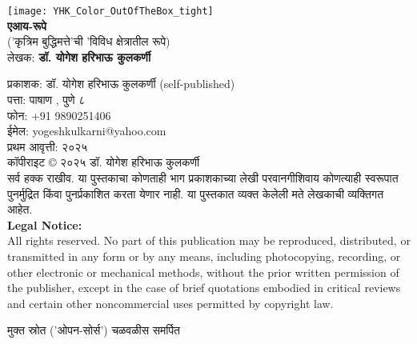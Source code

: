 \thispagestyle{empty}

\begin{center}
\texttt{[image: YHK\_Color\_OutOfTheBox\_tight]} \\[1.5em]

\textbf{\Large एआय-रूपे}\\ [0.5em]
('कृत्रिम बुद्धिमत्ते'ची 'विविध क्षेत्रातील रूपे)\\[0.5em]

लेखक: \textbf{डॉ. योगेश हरिभाऊ कुलकर्णी}\\[1.5em]
\end{center}

\begin{flushleft}

प्रकाशक: डॉ. योगेश हरिभाऊ कुलकर्णी (self-published)\\
पत्ता:  पाषाण ,  पुणे ८ \\
फोन:  +91 9890251406\\
ईमेल: yogeshkulkarni@yahoo.com\\[1.5em]

प्रथम आवृत्ती: २०२५\\[0.5em]


कॉपीराइट © २०२५ डॉ. योगेश हरिभाऊ कुलकर्णी\\[0.5em]

सर्व हक्क राखीव. या पुस्तकाचा कोणताही भाग प्रकाशकाच्या लेखी परवानगीशिवाय कोणत्याही स्वरूपात पुनर्मुद्रित किंवा पुनर्प्रकाशित करता येणार नाही.  या पुस्तकात व्यक्त केलेली मते लेखकाची व्यक्तिगत आहेत.\\[1.5em]

\textbf{Legal Notice:}\\
All rights reserved. No part of this publication may be reproduced, distributed, or transmitted in any form or by any means, including photocopying, recording, or other electronic or mechanical methods, without the prior written permission of the publisher, except in the case of brief quotations embodied in critical reviews and certain other noncommercial uses permitted by copyright law.
\end{flushleft}
\vfill\null
\clearpage

\begin{dedication}
मुक्त स्रोत ('ओपन-सोर्स') चळवळीस  समर्पित  
\end{dedication}

\clearpage

